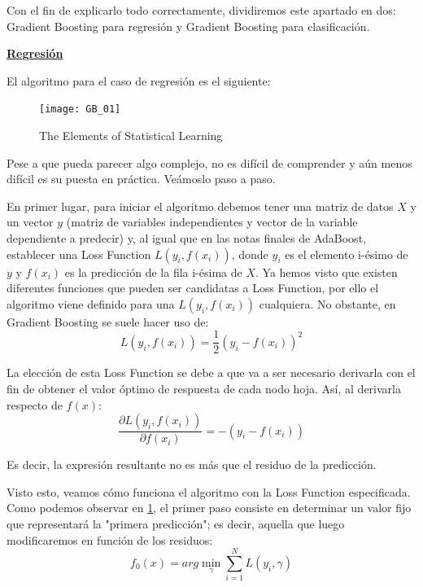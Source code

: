 \documentclass[12pt,twoside]{article}
\begin{document}
Con el fin de explicarlo todo correctamente, dividiremos este apartado en dos: Gradient Boosting para regresión y Gradient Boosting para clasificación.

\bigskip \bigskip \bigskip

\textbf{\underline{Regresión}}

\bigskip

El algoritmo para el caso de regresión es el siguiente:

\begin{figure}[h]
\centering
\texttt{[image: GB\_01]}
\caption{The Elements of Statistical Learning}
\label{fig:GB_01}
\end{figure}

Pese a que pueda parecer algo complejo, no es difícil de comprender y aún menos difícil es su puesta en práctica. Veámoslo paso a paso.

En primer lugar, para iniciar el algoritmo debemos tener una matriz de datos $X$ y un vector $y$ (matriz de variables independientes y vector de la variable dependiente a predecir) y, al igual que en las notas finales de AdaBoost, establecer una Loss Function $L(y_i, f(x_i))$, donde $y_i$ es el elemento i-ésimo de $y$ y $f(x_i)$ es la predicción de la fila i-ésima de $X$. Ya hemos visto que existen diferentes funciones que pueden ser candidatas a Loss Function, por ello el algoritmo viene definido para una $L(y_i, f(x_i))$ cualquiera. No obstante, en Gradient Boosting se suele hacer uso de:
\begin{equation*}
L(y_i, f(x_i)) = \frac{1}{2}(y_i - f(x_i))^2
\end{equation*}

La elección de esta Loss Function se debe a que va a ser necesario derivarla con el fin de obtener el valor óptimo de respuesta de cada nodo hoja. Así, al derivarla respecto de $f(x)$:
\begin{equation*}
\frac{\partial L(y_i, f(x_i))}{\partial f(x_i)} = -(y_i -f(x_i))
\end{equation*}

Es decir, la expresión resultante no es más que el residuo de la predicción.

Visto esto, veamos cómo funciona el algoritmo con la Loss Function especificada. Como podemos observar en \ref{fig:GB_01}, el primer paso consiste en determinar un valor fijo que representará la "primera predicción"; es decir, aquella que luego modificaremos en función de los residuos:
\begin{equation*}
f_0(x) = arg\min_{\gamma} \sum_{i=1}^N L(y_i, \gamma)
\end{equation*}
\end{document}
